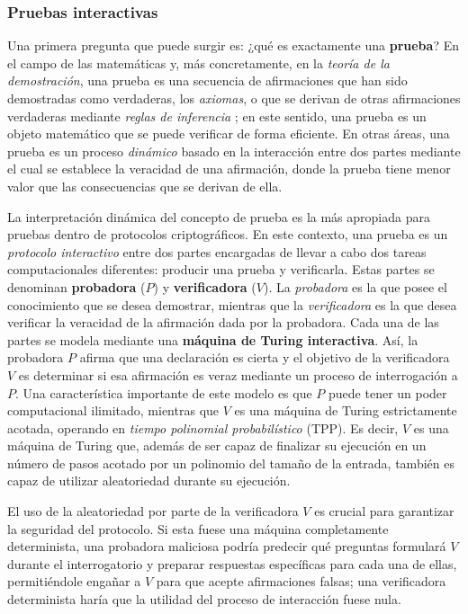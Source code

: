 \documentclass[a4paper, 11pt]{article}
\begin{document}
\subsubsection{Pruebas interactivas} \label{zk_pruebas_interactivas}

Una primera pregunta que puede surgir es: ¿qué es exactamente una \textbf{prueba}? En el campo de las
matemáticas y, más concretamente, en la \textit{teoría de la demostración}, una prueba es una
secuencia de afirmaciones que han sido demostradas como verdaderas, los \textit{axiomas}, o que se
derivan de otras afirmaciones verdaderas mediante \textit{reglas de inferencia}
\cite[Capítulo~4]{goldreich2001foundations}; en este sentido, una prueba es un objeto matemático que
se puede verificar de forma eficiente. En otras áreas, una prueba es un proceso \textit{dinámico}
basado en la interacción entre dos partes mediante el cual se establece la veracidad de una afirmación,
donde la prueba tiene menor valor que las consecuencias que se derivan de ella.

La interpretación dinámica del concepto de prueba es la más apropiada para pruebas dentro de protocolos
criptográficos. En este contexto, una prueba es un \textit{protocolo interactivo} entre dos partes
encargadas de llevar a cabo dos tareas computacionales diferentes: producir una prueba y verificarla.
Estas partes se denominan \textbf{probadora} ($P$) y \textbf{verificadora} ($V$). La \textit{probadora}
es la que posee el conocimiento que se desea demostrar, mientras que la \textit{verificadora} es la
que desea verificar la veracidad de la afirmación dada por la probadora. Cada una de las partes se
modela mediante una \textbf{máquina de Turing interactiva}. Así, la probadora $P$ afirma que una
declaración es cierta y el objetivo de la verificadora $V$ es determinar si esa afirmación es veraz
mediante un proceso de interrogación a $P$. Una característica importante de este modelo es que $P$
puede tener un poder computacional ilimitado, mientras que $V$ es una máquina de Turing
estrictamente acotada, operando en \textit{tiempo polinomial probabilístico} (TPP). Es decir,
$V$ es una máquina de Turing que, además de ser capaz de finalizar su ejecución en un número de pasos
acotado por un polinomio del tamaño de la entrada, también es capaz de utilizar aleatoriedad durante
su ejecución.

El uso de la aleatoriedad por parte de la verificadora $V$ es crucial para garantizar la seguridad
del protocolo. Si esta fuese una máquina completamente determinista, una probadora maliciosa podría
predecir qué preguntas formulará $V$ durante el interrogatorio y preparar respuestas específicas para
cada una de ellas, permitiéndole engañar a $V$ para que acepte afirmaciones falsas; una verificadora
determinista haría que la utilidad del proceso de interacción fuese nula.
\end{document}
